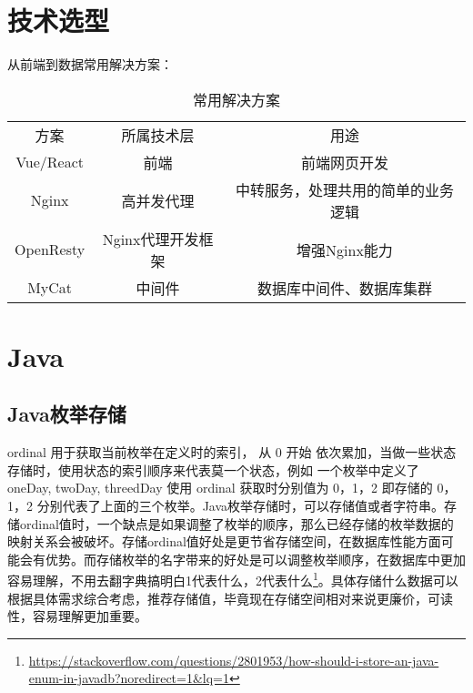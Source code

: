 \documentclass[../../../interview-questions.tex]{subfiles}
\begin{document}
\section{技术选型}

从前端到数据常用解决方案：


\begin{table}[htbp]
	\caption{常用解决方案}
	\label{table:solution}
	\begin{center}
		\begin{tabular}{|c|c|c|}
			\hline
			\multirow{1}{*}{方案}
			& \multicolumn{1}{c|}{所属技术层}
			& \multicolumn{1}{c|}{用途}\\			
			\cline{1-3}
			Vue/React & 前端 &  前端网页开发    \\
			\hline
			Nginx & 高并发代理 &  中转服务，处理共用的简单的业务逻辑    \\
			\hline
			OpenResty & Nginx代理开发框架 &  增强Nginx能力    \\
			\hline
			MyCat & 中间件 &  数据库中间件、数据库集群    \\
			\hline							
		\end{tabular}	
	\end{center}
\end{table}



\section{Java}

\subsection{Java枚举存储}

ordinal 用于获取当前枚举在定义时的索引， 从 0 开始 依次累加，当做一些状态存储时，使用状态的索引顺序来代表莫一个状态，例如 一个枚举中定义了 oneDay, twoDay, threedDay 使用 ordinal 获取时分别值为 0，1，2 即存储的 0，1，2 分别代表了上面的三个枚举。Java枚举存储时，可以存储值或者字符串。存储ordinal值时，一个缺点是如果调整了枚举的顺序，那么已经存储的枚举数据的映射关系会被破坏。存储ordinal值好处是更节省存储空间，在数据库性能方面可能会有优势。而存储枚举的名字带来的好处是可以调整枚举顺序，在数据库中更加容易理解，不用去翻字典搞明白1代表什么，2代表什么\footnote{\url{https://stackoverflow.com/questions/2801953/how-should-i-store-an-java-enum-in-javadb?noredirect=1&lq=1}}。具体存储什么数据可以根据具体需求综合考虑，推荐存储值，毕竟现在存储空间相对来说更廉价，可读性，容易理解更加重要。
\end{document}

